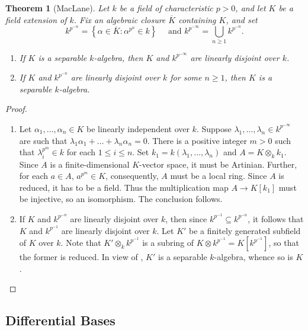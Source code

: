 \documentclass[10pt]{article}
\theoremstyle{thmstyle}
\newtheorem{theorem}{Theorem}[section]
\theoremstyle{defstyle}
\renewcommand{\le}{\leqslant}
\renewcommand{\ge}{\geqslant}
\begin{document}
\begin{theorem}[MacLane]
    Let $k$ be a field of characteristic $p > 0$, and let $K$ be a field extension of $k$. Fix an algebraic closure $\overline K$ containing $K$, and set 
    \begin{equation*}
        k^{p^{-n}} = \left\{\alpha\in\overline K\colon \alpha^{p^n}\in k\right\}\quad\text{ and } k^{p^{-\infty}} = \bigcup_{n\ge 1} k^{p^{-n}}.
    \end{equation*}
    \begin{enumerate}[label=(\arabic*)]
        \item If $K$ is a separable $k$-algebra, then $K$ and $k^{p^{-\infty}}$ are linearly disjoint over $k$. 
        \item If $K$ and $k^{p^{-n}}$ are linearly disjoint over $k$ for some $n\ge 1$, then $K$ is a separable $k$-algebra.
    \end{enumerate}
\end{theorem}
\begin{proof}
\begin{enumerate}[label=(\arabic*)]
    \item Let $\alpha_1,\dots,\alpha_n\in K$ be linearly independent over $k$. Suppose $\lambda_1,\dots,\lambda_n\in k^{p^{-\infty}}$ are such that $\lambda_1\alpha_1 + \dots + \lambda_n\alpha_n = 0$. There is a positive integer $m > 0$ such that $\lambda_i^{p^m}\in k$ for each $1\le i\le n$. Set $k_1 = k(\lambda_1,\dots,\lambda_n)$ and $A = K\otimes_k k_1$. Since $A$ is a finite-dimensional $K$-vector space, it must be Artinian. Further, for each $a\in A$, $a^{p^m}\in K$, consequently, $A$ must be a local ring. Since $A$ is reduced, it has to be a field. Thus the multiplication map $A\to K[k_1]$ must be injective, so an isomorphism. The conclusion follows. 
    \item If $K$ and $k^{p^{-n}}$ are linearly disjoint over $k$, then since $k^{p^{-1}}\subseteq k^{p^{-n}}$, it follows that $K$ and $k^{p^{-1}}$ are linearly disjoint over $k$. Let $K'$ be a finitely generated subfield of $K$ over $k$. Note that $K'\otimes_k k^{p^{-1}}$ is a subring of $K\otimes k^{p^{-1}} = K[k^{p^{-1}}]$, so that the former is reduced. In view of , $K'$ is a separable $k$-algebra, whence so is $K$. \qedhere
\end{enumerate}
\end{proof}

\subsection{Differential Bases}
\end{document}

